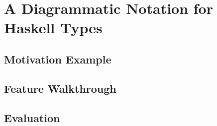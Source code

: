 


\chapter{A Diagrammatic Notation for Haskell Types}

\label{chapter5} 


\section{Motivation Example}

\section{Feature Walkthrough}

\section{Evaluation}
